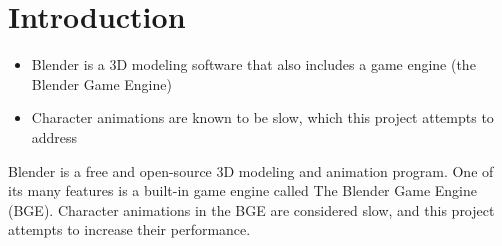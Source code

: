 \section{Introduction}
\ifsummaries
\begin{itemize}
 \item Blender is a 3D modeling software that also includes a game engine (the Blender Game Engine)
 \item Character animations are known to be slow, which this project attempts to address
\end{itemize}
\fi

Blender is a free and open-source 3D modeling and animation program\cite{blender}. One of its many features is a built-in game engine called The Blender Game Engine (BGE). Character animations in the BGE are considered slow, and this project attempts to increase their performance.

